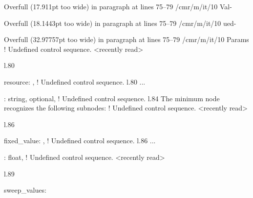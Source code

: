{{Overfull \hbox (17.911pt too wide) in paragraph at lines 75--79
/cmr/m/it/10 Val-

Overfull \hbox (18.1443pt too wide) in paragraph at lines 75--79
/cmr/m/it/10 ued-

Overfull \hbox (32.97757pt too wide) in paragraph at lines 75--79
/cmr/m/it/10 Params
! Undefined control sequence.
<recently read> \xmlAttr 
                         
l.80               \item \xmlAttr
                                 {resource}: ,
! Undefined control sequence.
l.80 ...        \item {}: \xmlDesc
                                                  {string, optional},
! Undefined control sequence.
l.84           The \xmlNode
                           {minimum} node recognizes the following subnodes:
! Undefined control sequence.
<recently read> \xmlNode 
                         
l.86             \item \xmlNode
                               {fixed\_value}: ,
! Undefined control sequence.
l.86 ...    \item {}: \xmlDesc
                                                  {float},
! Undefined control sequence.
<recently read> \xmlNode 
                         
l.89             \item \xmlNode
                               {sweep\_values}: }}

